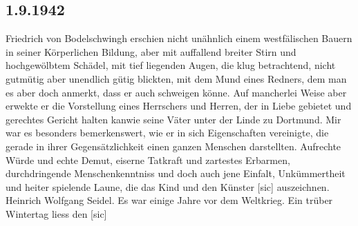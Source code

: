 \subsection{1.9.1942}

Friedrich von Bodelschwingh erschien nicht un\"{a}hnlich einem westf\"{a}lischen Bauern in seiner K\"{o}rperlichen Bildung, aber mit auffallend breiter Stirn und hochgew\"{o}lbtem Sch\"{a}del, mit tief liegenden Augen, die klug betrachtend, nicht gutm\"{u}tig aber unendlich g\"{u}tig blickten, mit dem Mund eines Redners, dem man es aber doch anmerkt, dass er auch schweigen k\"{o}nne.
Auf mancherlei Weise aber erwekte er die Vorstellung eines Herrschers und Herren, der in Liebe gebietet und gerechtes Gericht halten kanwie seine V\"{a}ter unter der Linde zu Dortmund.
Mir war es besonders bemerkenswert, wie er in sich Eigenschaften vereinigte, die gerade in ihrer Gegens\"{a}tzlichkeit einen ganzen Menschen darstellten.
Aufrechte W\"{u}rde und echte Demut, eiserne Tatkraft und zartestes Erbarmen, durchdringende Menschenkenntniss und doch auch jene Einfalt, Unk\"{u}mmertheit und heiter spielende Laune, die das Kind und den K\"{u}nster {\color{red} [sic] } auszeichnen.
Heinrich Wolfgang Seidel.
Es war einige Jahre vor dem Weltkrieg.
Ein tr\"{u}ber Wintertag liess den {\color{red} [sic] }

\clearpage
